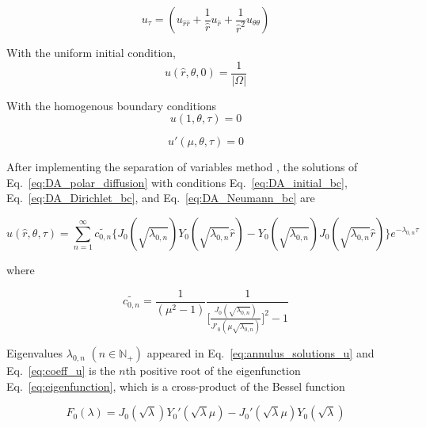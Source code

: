 {\begin{equation}\label{eq:DA_polar_diffusion}
  u_\tau = (u_{\hat r \hat r} + \frac{1}{\hat r} u_{\hat r} + \frac{1}{\hat r ^2} u_{\theta\theta})
\end{equation}

With the uniform initial condition,
\begin{equation}\label{eq:DA_initial_bc}
  u(\hat r, \theta, 0) = \frac{1}{|\Omega|}
\end{equation}

With the homogenous boundary conditions
\begin{equation}\label{eq:DA_Dirichlet_bc}
  u(1, \theta, \tau) = 0
\end{equation}

\begin{equation}\label{eq:DA_Neumann_bc}
  u'(\mu, \theta, \tau) = 0
\end{equation}



After implementing the separation of variables method
\cite{crank1979mathematics}, the solutions of
Eq.~\ref{eq:DA_polar_diffusion} with conditions
Eq.~\ref{eq:DA_initial_bc}, Eq.~\ref{eq:DA_Dirichlet_bc}, and
Eq.~\ref{eq:DA_Neumann_bc} are

\begin{equation}\label{eq:annulus_solutions_u}
  u(\hat r, \theta, \tau) = \sum_{n=1}^{\infty}
  \tilde{c_{0,n}} \bigg\{J_0(\sqrt{\lambda_{0,n}})
  Y_0(\sqrt{\lambda_{0,n}} \hat r) -
  Y_0(\sqrt{\lambda_{0,n}}) J_0(\sqrt{\lambda_{0,n}} \hat
  r)\bigg\} e^{-\lambda_{0,n}\tau}
\end{equation}

where

\begin{equation}\label{eq:coeff_u}
  \tilde{c_{0,n}} = \frac{1}{(\mu^2 - 1)}
\frac{1}{\bigg[\frac{J_0(\sqrt{\lambda_{0,n}})}{J'_0(\mu
      \sqrt{\lambda_{0,n}})}\bigg]^2 -1}
\end{equation}


Eigenvalues $\lambda_{0, n}$ $(n \in \mathbb{N}_{+})$ appeared in
Eq.~\ref{eq:annulus_solutions_u} and Eq.~\ref{eq:coeff_u} is the $n$th
positive root of the eigenfunction Eq.~\ref{eq:eigenfunction}, which
is a cross-product of the Bessel function \cite{watson1995treatise}

\begin{equation}\label{eq:eigenfunction}
  F_0(\lambda) = J_0(\sqrt{\lambda}) Y_0'(\sqrt{\lambda} \mu) -
  J_0'(\sqrt{\lambda} \mu) Y_0(\sqrt{\lambda})
\end{equation}


}
